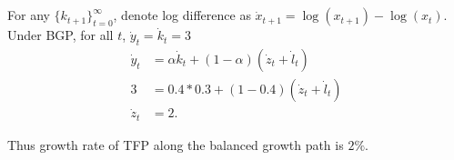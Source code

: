 \documentclass{ltjsarticle}
\begin{document}
\section{} %
For any $\{k_{t+1} \}^{\infty}_{t=0}$, denote log difference as $\dot{x}_{t+1}= \log(x_{t+1})-\log(x_{t})$.\\
Under BGP, for all $t$,  $\dot{y}_t = \dot{k}_t = 3$
\begin{align*}
    \dot{y}_t &= \alpha \dot{k}_t + (1-\alpha)(\dot{z}_t + \dot{l}_t)\\
    3&= 0.4*0.3 + (1-0.4)(\dot{z}_t + \dot{l}_t)\\
    \dot{z}_t &= 2.
\end{align*}

Thus growth rate of TFP along the balanced growth path is $2\%$.
\end{document}
